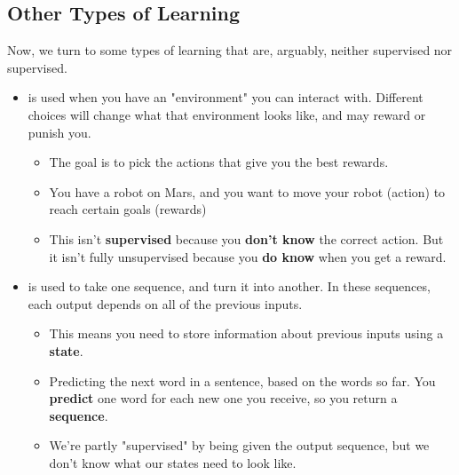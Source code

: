     \subsection{Other Types of Learning}
    
        Now, we turn to some types of learning that are, arguably, neither supervised nor supervised.
        
        \begin{itemize}
            \item {} is used when you have an "environment" you can interact with. Different choices will change what that environment looks like, and may reward or punish you.
                \begin{itemize}
                    \item The goal is to pick the actions that give you the best rewards.
                    \item \miniex You have a robot on Mars, and you want to move your robot (action) to reach certain goals (rewards)
                    \item This isn't \textbf{supervised} because you \textbf{don't know} the correct action. But it isn't fully unsupervised because you \textbf{do know} when you get a reward.
                \end{itemize}
            \item {} is used to take one sequence, and turn it into another. In these sequences, each output depends on all of the previous inputs. 
                \begin{itemize}
                    \item This means you need to store information about previous inputs using a \textbf{state}.
                    
                    \item \miniex Predicting the next word in a sentence, based on the words so far. You \textbf{predict} one word for each new one you receive, so you return a \textbf{sequence}.
                    
                    \item We're partly "supervised" by being given the output sequence, but we don't know what our states need to look like.
                \end{itemize}
        \end{itemize}
    
